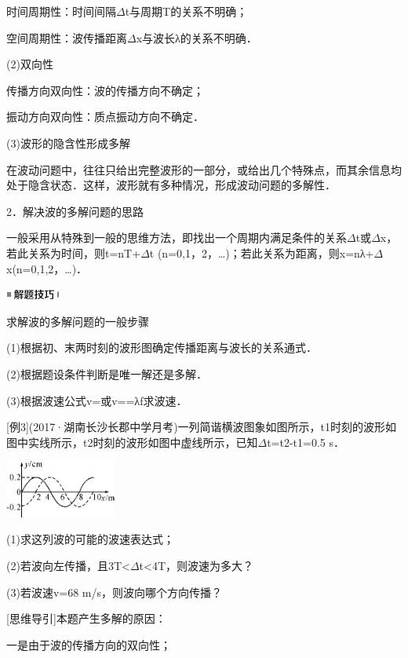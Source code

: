 时间周期性：时间间隔$\Delta$t与周期T的关系不明确；

空间周期性：波传播距离$\Delta$x与波长λ的关系不明确．

(2)双向性

传播方向双向性：波的传播方向不确定；

振动方向双向性：质点振动方向不确定．

(3)波形的隐含性形成多解

在波动问题中，往往只给出完整波形的一部分，或给出几个特殊点，而其余信息均处于隐含状态．这样，波形就有多种情况，形成波动问题的多解性．

2．解决波的多解问题的思路

一般采用从特殊到一般的思维方法，即找出一个周期内满足条件的关系$\Delta$t或$\Delta$x，若此关系为时间，则t=nT+$\Delta$t
(n=0,1，2，\ldots)；若此关系为距离，则x=nλ+$\Delta$x(n=0,1,2，\ldots)．

\begin{center}\includegraphics[width=0.70764in,height=0.12292in]{media/image37.png}\end{center}
求解波的多解问题的一般步骤

(1)根据初、末两时刻的波形图确定传播距离与波长的关系通式．

(2)根据题设条件判断是唯一解还是多解．

(3)根据波速公式v=或v==λf求波速．

{[}例3{]}(2017·湖南长沙长郡中学月考)一列简谐横波图象如图所示，t1时刻的波形如图中实线所示，t2时刻的波形如图中虚线所示，已知$\Delta$t=t2-t1=0.5
s．

\begin{center}\includegraphics[width=1.44306in,height=0.74514in]{media/image537.png}\end{center}
(1)求这列波的可能的波速表达式；

(2)若波向左传播，且3T\textless $\Delta$t\textless4T，则波速为多大？

(3)若波速v=68 m/s，则波向哪个方向传播？

{[}思维导引{]}本题产生多解的原因：

一是由于波的传播方向的双向性；

